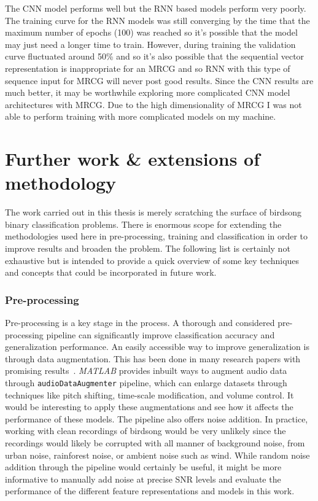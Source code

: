 The CNN model performs well but the RNN based models perform very poorly. The
training curve for the RNN models was still converging by the time that the
maximum number of epochs (100) was reached so it's possible that the model may
just need a longer time to train. However, during training the validation curve
fluctuated around 50\% and so it's also possible that the sequential vector
representation is inappropriate for an MRCG and so RNN with this type of
sequence input for MRCG will never post good results. Since the CNN results are
much better, it may be worthwhile exploring more complicated CNN model
architectures with MRCG\@. Due to the high dimensionality of MRCG I was not able
to perform training with more complicated models on my machine.

\section{Further work \& extensions of methodology}

The work carried out in this thesis is merely scratching the surface of birdsong
binary classification problems. There is enormous scope for extending the
methodologies used here in pre-processing, training and classification in order
to improve results and broaden the problem. The following list is certainly not
exhaustive but is intended to provide a quick overview of some key techniques
and concepts that could be incorporated in future work.

\subsubsection{Pre-processing}

Pre-processing is a key stage in the process. A thorough and considered
pre-processing pipeline can significantly improve classification accuracy and
generalization performance. An easily accessible way to improve generalization
is through data augmentation. This has been done in many research papers with
promising results~\cite{kahl2017large}. \textit{MATLAB} provides inbuilt ways to
augment audio data through \texttt{audioDataAugmenter} pipeline, which can
enlarge datasets through techniques like pitch shifting, time-scale
modification, and volume control. It would be interesting to apply these
augmentations and see how it affects the performance of these models. The
pipeline also offers noise addition. In practice, working with clean recordings
of birdsong would be very unlikely since the recordings would likely be
corrupted with all manner of background noise, from urban noise, rainforest
noise, or ambient noise such as wind. While random noise addition through the
pipeline would certainly be useful, it might be more informative to manually add
noise at precise SNR levels and evaluate the performance of the different
feature representations and models in this work.

